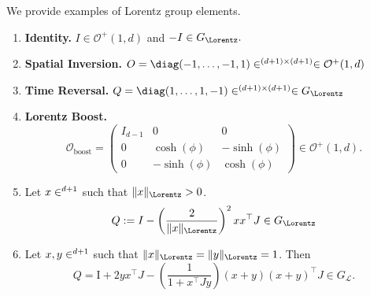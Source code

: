 \documentclass[twoside,11pt]{article}
\begin{document}
\begin{example}
We provide examples of Lorentz group elements. 
\begin{enumerate}
    \item \textbf{Identity.} $I \in \mathcal{O}^{+}(1,d)$ and $-I \in G_\Lorentz.$
   
    \item \textbf{Spatial Inversion.}  $O = \diag(-1,\ldots, -1, 1) \in \real^{(d+1)\times(d+1)} \in \mathcal{O}^+(1,d)$
    \item \textbf{Time Reversal.} $Q = \diag(1, \ldots, 1, -1) \in \real^{(d+1)\times(d+1)} \in G_\Lorentz$
    \item \textbf{Lorentz Boost.} 
    \[
\mathcal{O}_{\text{boost}} =
\begin{pmatrix}
I_{d-1} & 0 & 0 \\
0 & \cosh(\phi) & -\sinh(\phi) \\
0 & -\sinh(\phi) & \cosh(\phi)
\end{pmatrix} \in \mathcal{O}^+(1,d).
\]
    

     \item Let $x \in \real^{d+1}$ such that $\|x\|_\Lorentz > 0$. 
    \[
    Q := I - \left(\frac{2}{\|x\|_\Lorentz} \right)^2 x x^\top J \in G_\Lorentz
    \]
    \item Let $x,y \in \real^{d+1}$ such that $\|x\|_\Lorentz = \|y\|_\Lorentz = 1$. Then 
    \[
    Q=\mathrm{I}+2 y x^{\top} J-\left( \frac{1} {1+x^{\top} J y}\right)(x+y)(x+y)^{\top} J \in G_{\mathcal{L}} .
    \]
\end{enumerate}
    
\end{example}
\end{document}
